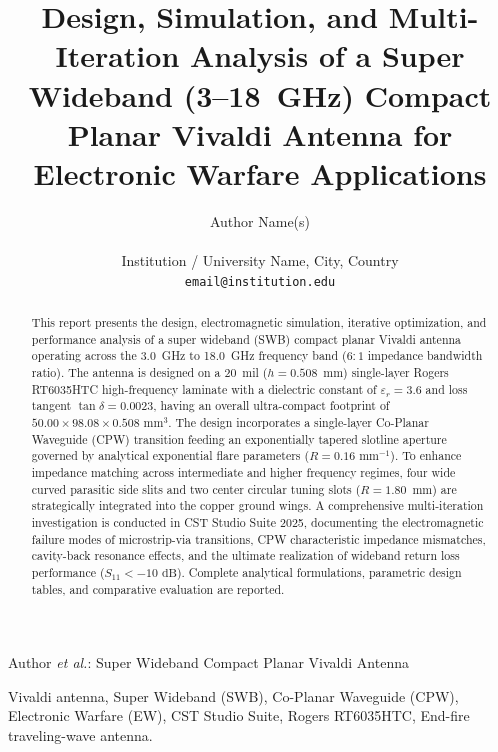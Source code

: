 \documentclass[journal,compsoc,twocolumn,10pt]{IEEEtran}
\begin{document}
\title{Design, Simulation, and Multi-Iteration Analysis of a Super Wideband (3--18~GHz) Compact Planar Vivaldi Antenna for Electronic Warfare Applications}

\author{Author Name(s) \\
 \\
Institution / University Name, City, Country \\
\texttt{email@institution.edu}
}

%
{Author \MakeLowercase{\textit{et al.}}: Super Wideband Compact Planar Vivaldi Antenna}

\maketitle

\begin{abstract}
This report presents the design, electromagnetic simulation, iterative optimization, and performance analysis of a super wideband (SWB) compact planar Vivaldi antenna operating across the 3.0~GHz to 18.0~GHz frequency band ($6:1$ impedance bandwidth ratio). The antenna is designed on a 20~mil ($h = 0.508$~mm) single-layer Rogers RT6035HTC high-frequency laminate with a dielectric constant of $\varepsilon_r = 3.6$ and loss tangent $\tan\delta = 0.0023$, having an overall ultra-compact footprint of $50.00 \times 98.08 \times 0.508\text{ mm}^3$. The design incorporates a single-layer Co-Planar Waveguide (CPW) transition feeding an exponentially tapered slotline aperture governed by analytical exponential flare parameters ($R = 0.16\text{ mm}^{-1}$). To enhance impedance matching across intermediate and higher frequency regimes, four wide curved parasitic side slits and two center circular tuning slots ($R = 1.80$~mm) are strategically integrated into the copper ground wings. A comprehensive multi-iteration investigation is conducted in CST Studio Suite 2025, documenting the electromagnetic failure modes of microstrip-via transitions, CPW characteristic impedance mismatches, cavity-back resonance effects, and the ultimate realization of wideband return loss performance ($S_{11} < -10\text{ dB}$). Complete analytical formulations, parametric design tables, and comparative evaluation are reported.
\end{abstract}

\begin{IEEEkeywords}
Vivaldi antenna, Super Wideband (SWB), Co-Planar Waveguide (CPW), Electronic Warfare (EW), CST Studio Suite, Rogers RT6035HTC, End-fire traveling-wave antenna.
\end{IEEEkeywords}
\end{document}
